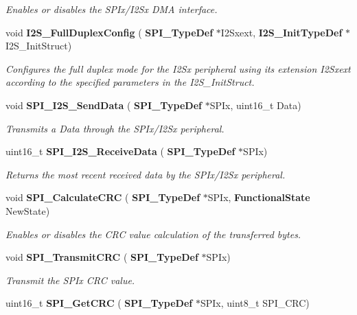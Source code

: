 \begin{DoxyCompactItemize}
\begin{DoxyCompactList}\small\item\em Enables or disables the S\+P\+Ix/\+I2\+Sx D\+MA interface. \end{DoxyCompactList}\item 
void \textbf{ I2\+S\+\_\+\+Full\+Duplex\+Config} (\textbf{ S\+P\+I\+\_\+\+Type\+Def} $\ast$I2\+Sxext, \textbf{ I2\+S\+\_\+\+Init\+Type\+Def} $\ast$I2\+S\+\_\+\+Init\+Struct)
\begin{DoxyCompactList}\small\item\em Configures the full duplex mode for the I2\+Sx peripheral using its extension I2\+Sxext according to the specified parameters in the I2\+S\+\_\+\+Init\+Struct. \end{DoxyCompactList}\item 
void \textbf{ S\+P\+I\+\_\+\+I2\+S\+\_\+\+Send\+Data} (\textbf{ S\+P\+I\+\_\+\+Type\+Def} $\ast$S\+P\+Ix, uint16\+\_\+t Data)
\begin{DoxyCompactList}\small\item\em Transmits a Data through the S\+P\+Ix/\+I2\+Sx peripheral. \end{DoxyCompactList}\item 
uint16\+\_\+t \textbf{ S\+P\+I\+\_\+\+I2\+S\+\_\+\+Receive\+Data} (\textbf{ S\+P\+I\+\_\+\+Type\+Def} $\ast$S\+P\+Ix)
\begin{DoxyCompactList}\small\item\em Returns the most recent received data by the S\+P\+Ix/\+I2\+Sx peripheral. \end{DoxyCompactList}\item 
void \textbf{ S\+P\+I\+\_\+\+Calculate\+C\+RC} (\textbf{ S\+P\+I\+\_\+\+Type\+Def} $\ast$S\+P\+Ix, \textbf{ Functional\+State} New\+State)
\begin{DoxyCompactList}\small\item\em Enables or disables the C\+RC value calculation of the transferred bytes. \end{DoxyCompactList}\item 
void \textbf{ S\+P\+I\+\_\+\+Transmit\+C\+RC} (\textbf{ S\+P\+I\+\_\+\+Type\+Def} $\ast$S\+P\+Ix)
\begin{DoxyCompactList}\small\item\em Transmit the S\+P\+Ix C\+RC value. \end{DoxyCompactList}\item 
uint16\+\_\+t \textbf{ S\+P\+I\+\_\+\+Get\+C\+RC} (\textbf{ S\+P\+I\+\_\+\+Type\+Def} $\ast$S\+P\+Ix, uint8\+\_\+t S\+P\+I\+\_\+\+C\+RC)

\end{DoxyCompactItemize}
